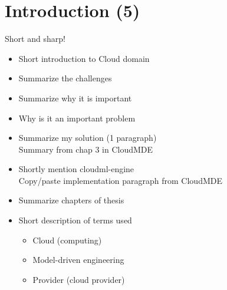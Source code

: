 \section{Introduction (5)}

Short and sharp!

\begin{itemize}
  \item Short introduction to Cloud domain
  \item Summarize the challenges
  \item Summarize why it is important
  \item Why is it an important problem
  \item Summarize my solution (1 paragraph) \\
      Summary from chap 3 in CloudMDE
  \item Shortly mention cloudml-engine \\
      Copy/paste implementation paragraph from CloudMDE
  \item Summarize chapters of thesis
  \item Short description of terms used
    \begin{itemize}
      \item Cloud (computing)
      \item Model-driven engineering
      \item Provider (cloud provider)
    \end{itemize}
\end{itemize}

